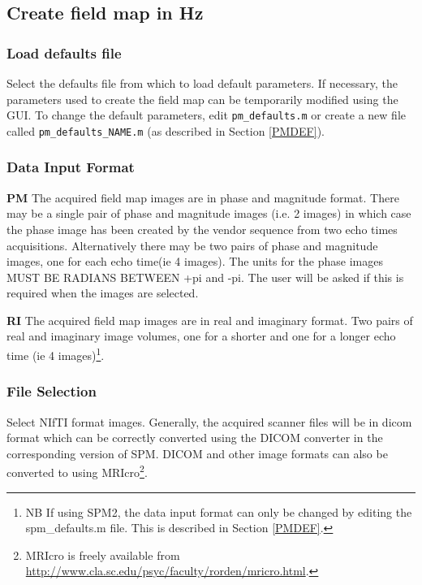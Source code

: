 \subsection{Create field map in Hz}

\subsubsection{Load defaults file \label{loaddefs}}
Select the defaults file from which to load default parameters. If necessary, the parameters used to create the field map can be temporarily modified using the GUI. To change the default parameters, edit \texttt{pm\_defaults.m} or create a new file called \texttt{pm\_defaults\_NAME.m} (as described in Section \ref{PMDEF}).

\subsubsection{Data Input Format}
{\bf PM} The acquired field map images are in phase and magnitude format. There may be a single pair of phase and magnitude images (i.e. 2 images) in which case the phase image has been created by the vendor sequence from two echo times acquisitions. Alternatively there may be two pairs of phase and magnitude images, one for each echo time(ie 4 images). The units for the phase images MUST BE RADIANS BETWEEN +pi and -pi. The user will be asked if this is required when the images are selected.

{\bf RI} The acquired field map images are in real and imaginary format. Two pairs of real and imaginary image volumes, one for a shorter and one for a longer echo time (ie 4 images)\footnote{
NB If using SPM2, the data input format can only be changed by editing the spm\_defaults.m file. This is described in Section \ref{PMDEF}.}.

\subsubsection{File Selection}
Select NIfTI format images. Generally, the acquired scanner files will be in dicom format which can be correctly converted using the DICOM converter in the corresponding version of SPM. DICOM and other image formats can also be converted to using MRIcro\footnote{MRIcro is freely available from \url{http://www.cla.sc.edu/psyc/faculty/rorden/mricro.html}.}.

